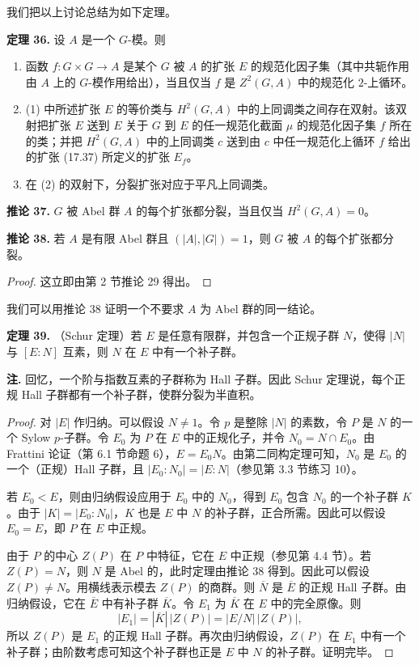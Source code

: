 我们把以上讨论总结为如下定理。

\medskip
\noindent\textbf{定理 36.} 设 $A$ 是一个 $G$-模。则
\begin{enumerate}[label=(\arabic*)]
  \item 函数 $f:G\times G\to A$ 是某个 $G$ 被 $A$ 的扩张 $E$ 的规范化因子集（其中共轭作用由 $A$ 上的 $G$-模作用给出），当且仅当 $f$ 是 $Z^2(G,A)$ 中的规范化 $2$-上循环。
  \item (1) 中所述扩张 $E$ 的等价类与 $H^2(G,A)$ 中的上同调类之间存在双射。该双射把扩张 $E$ 送到 $E$ 关于 $G$ 到 $E$ 的任一规范化截面 $\mu$ 的规范化因子集 $f$ 所在的类；并把 $H^2(G,A)$ 中的上同调类 $c$ 送到由 $c$ 中任一规范化上循环 $f$ 给出的扩张 (17.37) 所定义的扩张 $E_f$。
  \item 在 (2) 的双射下，分裂扩张对应于平凡上同调类。
\end{enumerate}

\medskip
\noindent\textbf{推论 37.} $G$ 被 Abel 群 $A$ 的每个扩张都分裂，当且仅当 $H^2(G,A)=0$。

\medskip
\noindent\textbf{推论 38.} 若 $A$ 是有限 Abel 群且 $(|A|,|G|)=1$，则 $G$ 被 $A$ 的每个扩张都分裂。

\begin{proof}
这立即由第 2 节推论 29 得出。
\end{proof}

我们可以用推论 38 证明一个不要求 $A$ 为 Abel 群的同一结论。

\medskip
\noindent\textbf{定理 39.} （Schur 定理）若 $E$ 是任意有限群，并包含一个正规子群 $N$，使得 $|N|$ 与 $[E:N]$ 互素，则 $N$ 在 $E$ 中有一个补子群。

\noindent\textbf{注.} 回忆，一个阶与指数互素的子群称为 Hall 子群。因此 Schur 定理说，每个正规 Hall 子群都有一个补子群，使群分裂为半直积。

\begin{proof}
对 $|E|$ 作归纳。可以假设 $N\neq1$。令 $p$ 是整除 $|N|$ 的素数，令 $P$ 是 $N$ 的一个 Sylow $p$-子群。令 $E_0$ 为 $P$ 在 $E$ 中的正规化子，并令 $N_0=N\cap E_0$。由 Frattini 论证（第 6.1 节命题 6），$E=E_0N$。由第二同构定理可知，$N_0$ 是 $E_0$ 的一个（正规）Hall 子群，且 $|E_0:N_0|=|E:N|$（参见第 3.3 节练习 10）。

若 $E_0<E$，则由归纳假设应用于 $E_0$ 中的 $N_0$，得到 $E_0$ 包含 $N_0$ 的一个补子群 $K$。由于 $|K|=|E_0:N_0|$，$K$ 也是 $E$ 中 $N$ 的补子群，正合所需。因此可以假设 $E_0=E$，即 $P$ 在 $E$ 中正规。

由于 $P$ 的中心 $Z(P)$ 在 $P$ 中特征，它在 $E$ 中正规（参见第 4.4 节）。若 $Z(P)=N$，则 $N$ 是 Abel 的，此时定理由推论 38 得到。因此可以假设 $Z(P)\neq N$。用横线表示模去 $Z(P)$ 的商群。则 $\overline N$ 是 $\overline E$ 的正规 Hall 子群。由归纳假设，它在 $\overline E$ 中有补子群 $\overline K$。令 $E_1$ 为 $\overline K$ 在 $E$ 中的完全原像。则
\[
  |E_1|=|\overline K|\,|Z(P)|=|E/N|\,|Z(P)|,
\]
所以 $Z(P)$ 是 $E_1$ 的正规 Hall 子群。再次由归纳假设，$Z(P)$ 在 $E_1$ 中有一个补子群；由阶数考虑可知这个补子群也正是 $E$ 中 $N$ 的补子群。证明完毕。
\end{proof}

